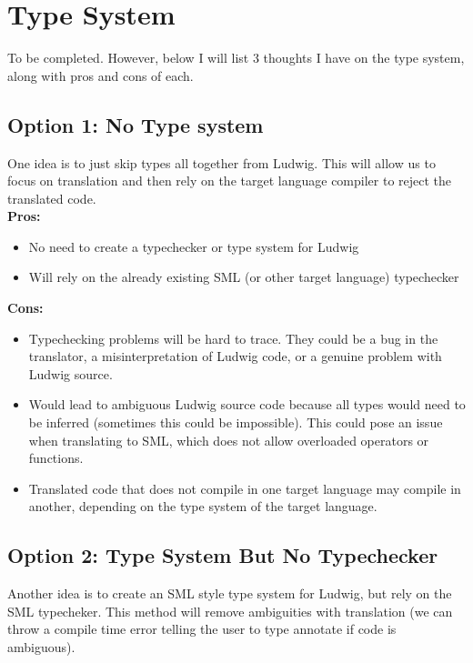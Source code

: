 \section{Type System}

To be completed. However, below I will list 3 thoughts I have on the type system, along with pros and cons of each.

\subsection{Option 1: No Type system}

One idea is to just skip types all together from Ludwig. This will allow us to focus on translation and then rely on the target language compiler to reject the translated code.\\

\textbf{Pros:}

\begin{itemize}
\item No need to create a typechecker or type system for Ludwig

\item Will rely on the already existing SML (or other target language) typechecker
\end{itemize}

\textbf{Cons:}

\begin{itemize}
\item Typechecking problems will be hard to trace. They could be a bug in the translator, a misinterpretation of Ludwig code, or a genuine problem with Ludwig source.

\item Would lead to ambiguous Ludwig source code because all types would need to be inferred (sometimes this could be impossible). This could pose an issue when translating to SML, which does not allow overloaded operators or functions.

\item Translated code that does not compile in one target language may compile in another, depending on the type system of the target language.
\end{itemize}

\subsection{Option 2: Type System But No Typechecker}

Another idea is to create an SML style type system for Ludwig, but rely on the SML typecheker. This method will remove ambiguities with translation (we can throw a compile time error telling the user to type annotate if code is ambiguous).\\

